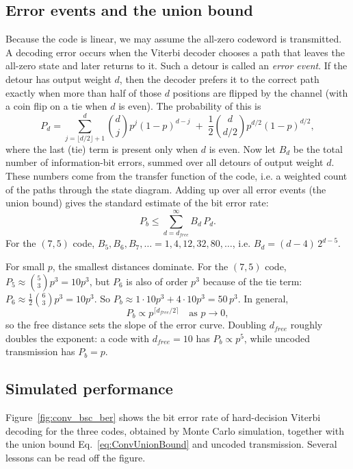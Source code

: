 \subsection{Error events and the union bound}
Because the code is linear, we may assume the all-zero codeword is transmitted. A decoding error occurs when the Viterbi decoder chooses a path that leaves the all-zero state and later returns to it. Such a detour is called an \emph{error event}. If the detour has output weight \(d\), then the decoder prefers it to the correct path exactly when more than half of those \(d\) positions are flipped by the channel (with a coin flip on a tie when \(d\) is even). The probability of this is
\begin{equation}
P_d = \sum_{j=\lfloor d/2 \rfloor + 1}^{d} \binom{d}{j} p^j (1-p)^{d-j} \;+\; \frac{1}{2}\binom{d}{d/2} p^{d/2}(1-p)^{d/2}, \label{eq:Pd}
\end{equation}
where the last (tie) term is present only when \(d\) is even.
Now let \(B_d\) be the total number of information-bit errors, summed over all detours of output weight \(d\). These numbers come from the transfer function of the code, i.e. a weighted count of the paths through the state diagram. Adding up over all error events (the union bound) gives the standard estimate of the bit error rate:
\begin{equation}
P_b \leq \sum_{d = d_{free}}^{\infty} B_d\, P_d. \label{eq:ConvUnionBound}
\end{equation}
For the \((7,5)\) code, \(B_5, B_6, B_7, \ldots = 1, 4, 12, 32, 80, \ldots\), i.e. \(B_d = (d-4)\,2^{d-5}\).

For small \(p\), the smallest distances dominate. For the \((7,5)\) code, \(P_5 \approx \binom{5}{3}p^3 = 10p^3\), but \(P_6\) is also of order \(p^3\) because of the tie term: \(P_6 \approx \frac{1}{2}\binom{6}{3}p^3 = 10p^3\). So \(P_b \approx 1 \cdot 10p^3 + 4 \cdot 10p^3 = 50\,p^3\). In general,
\[P_b \propto p^{\lceil d_{free}/2 \rceil} \quad \text{as } p \to 0,\]
so the free distance sets the slope of the error curve. Doubling \(d_{free}\) roughly doubles the exponent: a code with \(d_{free} = 10\) has \(P_b \propto p^5\), while uncoded transmission has \(P_b = p\).

\subsection{Simulated performance}
Figure~\ref{fig:conv_bsc_ber} shows the bit error rate of hard-decision Viterbi decoding for the three codes, obtained by Monte Carlo simulation, together with the union bound Eq.~\ref{eq:ConvUnionBound} and uncoded transmission. Several lessons can be read off the figure.


